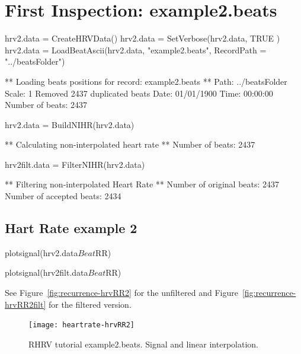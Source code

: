 \documentclass[a4paper, english, utf8]{amsart}
\newcommand{\figref}[1]{Figure\ \vref{#1}}
\begin{document}
\section{First Inspection: example2.beats}
\begin{Schunk}
\begin{Sinput}
  hrv2.data  = CreateHRVData()
  hrv2.data = SetVerbose(hrv2.data, TRUE )
  hrv2.data = LoadBeatAscii(hrv2.data, "example2.beats",
         RecordPath = "../beatsFolder")
\end{Sinput}
\begin{Soutput}
** Loading beats positions for record: example2.beats **
   Path: ../beatsFolder 
   Scale: 1 
   Removed 2437 duplicated beats
   Date: 01/01/1900
   Time: 00:00:00
   Number of beats: 2437 
\end{Soutput}
\begin{Sinput}
  hrv2.data = BuildNIHR(hrv2.data)
\end{Sinput}
\begin{Soutput}
** Calculating non-interpolated heart rate **
   Number of beats: 2437 
\end{Soutput}
\begin{Sinput}
  hrv2filt.data = FilterNIHR(hrv2.data)
\end{Sinput}
\begin{Soutput}
** Filtering non-interpolated Heart Rate **
   Number of original beats: 2437 
   Number of accepted beats: 2434 
\end{Soutput}
\end{Schunk}

\subsection{Hart Rate example 2}
\begin{Schunk}
\begin{Sinput}
  plotsignal(hrv2.data$Beat$RR)
\end{Sinput}
\end{Schunk}
\begin{Schunk}
\begin{Sinput}
  plotsignal(hrv2filt.data$Beat$RR)
\end{Sinput}
\end{Schunk}
See \figref{fig:recurrence-hrvRR2} for the unfiltered and \figref{fig:recurrence-hrvRR2filt} for the filtered version.


\begin{figure}[htbp]
\begin{center}
\texttt{[image: heartrate-hrvRR2]}
\caption{RHRV tutorial example2.beats. Signal and linear interpolation.}
\label{fig:recurrence-hrvRR2}
\end{center}
\end{figure}
\end{document}
